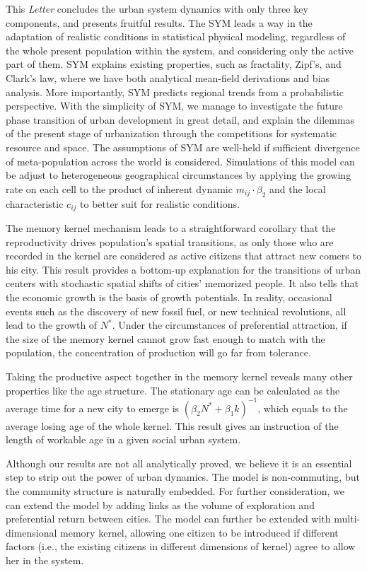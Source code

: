 \documentclass[reprint,unsortedaddress,amsmath,amssymb,aps,prl,showkeys]{revtex4-2}
\begin{document}
This \emph{Letter} concludes the urban system dynamics with only three key components, and presents fruitful results. The SYM leads a way in the adaptation of realistic conditions in statistical physical modeling, regardless of the whole present population within the system, and considering only the active part of them. SYM explains existing properties, such as fractality, Zipf's, and Clark's law, where we have both analytical mean-field derivations and bias analysis. More importantly, SYM predicts regional trends from a probabilistic perspective. With the simplicity of SYM, we manage to investigate the future phase transition of urban development in great detail, and explain the dilemmas of the present stage of urbanization through the competitions for systematic resource and space. The assumptions of SYM are well-held if sufficient divergence of meta-population across the world is considered. Simulations of this model can be adjust to heterogeneous geographical circumstances by applying the growing rate on each cell to the product of inherent dynamic $m_{ij}\cdot \beta_2$ and the local characteristic $c_{ij}$ to better suit for realistic conditions.

The memory kernel mechanism leads to a straightforward corollary that the reproductivity drives population's spatial transitions, as only those who are recorded in the kernel are considered as active citizens that attract new comers to his city. This result provides a bottom-up explanation for the transitions of urban centers with stochastic spatial shifts of cities' memorized people. It also tells that the economic growth is the basis of growth potentials. In reality, occasional events such as the discovery of new fossil fuel, or new technical revolutions, all lead to the growth of $N^*$. Under the circumstances of preferential attraction, if the size of the memory kernel cannot grow fast enough to match with the population, the concentration of production will go far from tolerance. 

Taking the productive aspect together in the memory kernel reveals many other properties like the age structure. The stationary age can be calculated as the average time for a new city to emerge is $(\beta_2 N^* + \beta_1 k)^{-1}$, which equals to the average losing age of the whole kernel. This result gives an instruction of the length of workable age in a given social urban system.

Although our results are not all analytically proved, we believe it is an essential step to strip out the power of urban dynamics. The model is non-commuting, but the community structure is naturally embedded. For further consideration, we can extend the model by adding links as the volume of exploration and preferential return between cities\cite{WANG2019121921}. The model can further be extended with multi-dimensional memory kernel, allowing one citizen to be introduced if different factors\cite{tokita2020social} (i.e., the existing citizens in different dimensions of kernel) agree to allow her in the system.




\end{document}
